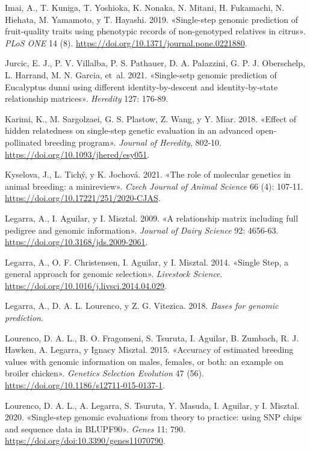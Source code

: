 \documentclass[11pt,spanish,a4paper,oneside,]{book} %
\begin{document}
\leavevmode\hypertarget{ref-cite:20}{}%
Imai, A., T. Kuniga, T. Yoshioka, K. Nonaka, N. Mitani, H. Fukamachi, N. Hiehata, M. Yamamoto, y T. Hayashi. 2019. «Single-step genomic prediction of fruit-quality traits using phenotypic records of non-genotyped relatives in citrus». \emph{PLoS ONE} 14 (8). \url{https://doi.org/10.1371/journal.pone.0221880}.

\leavevmode\hypertarget{ref-cite:11}{}%
Jurcic, E. J., P. V. Villalba, P. S. Pathauer, D. A. Palazzini, G. P. J. Oberschelp, L. Harrand, M. N. Garcia, et~al. 2021. «Single-setp genomic prediction of Eucalyptus dunni using different identity-by-descent and identity-by-state relationship matrices». \emph{Heredity} 127: 176-89.

\leavevmode\hypertarget{ref-cite:76}{}%
Karimi, K., M. Sargolzaei, G. S. Plastow, Z. Wang, y Y. Miar. 2018. «Effect of hidden relatedness on single-step genetic evaluation in an advanced open-pollinated breeding program». \emph{Journal of Heredity}, 802-10. \url{https://doi.org/10.1093/jhered/esy051}.

\leavevmode\hypertarget{ref-cite:32}{}%
Kyselova, J., L. Tichý, y K. Jochová. 2021. «The role of molecular genetics in animal breeding: a minireview». \emph{Czech Journal of Animal Science} 66 (4): 107-11. \url{https://doi.org/10.17221/251/2020-CJAS}.

\leavevmode\hypertarget{ref-cite:17}{}%
Legarra, A., I. Aguilar, y I. Misztal. 2009. «A relationship matrix including full pedigree and genomic information». \emph{Journal of Dairy Science} 92: 4656-63. \url{https://doi.org/10.3168/jds.2009-2061}.

\leavevmode\hypertarget{ref-cite:15}{}%
Legarra, A., O. F. Christensen, I. Aguilar, y I. Misztal. 2014. «Single Step, a general approach for genomic selection». \emph{Livestock Science}. \url{https://doi.org/10.1016/j.livsci.2014.04.029}.

\leavevmode\hypertarget{ref-cite:30}{}%
Legarra, A., D. A. L. Lourenco, y Z. G. Vitezica. 2018. \emph{Bases for genomic prediction}.

\leavevmode\hypertarget{ref-cite:87}{}%
Lourenco, D. A. L., B. O. Fragomeni, S. Tsuruta, I. Aguilar, B. Zumbach, R. J. Hawken, A. Legarra, y Ignacy Misztal. 2015. «Accuracy of estimated breeding values with genomic information on males, females, or both: an example on broiler chicken». \emph{Genetics Selection Evolution} 47 (56). \url{https://doi.org/10.1186/s12711-015-0137-1}.

\leavevmode\hypertarget{ref-cite:22}{}%
Lourenco, D. A. L., A. Legarra, S. Tsuruta, Y. Masuda, I. Aguilar, y I. Misztal. 2020. «Single-step genomic evaluations from theory to practice: using SNP chips and sequence data in BLUPF90». \emph{Genes} 11: 790. \url{https://doi.org/doi:10.3390/genes11070790}.
\end{document}

